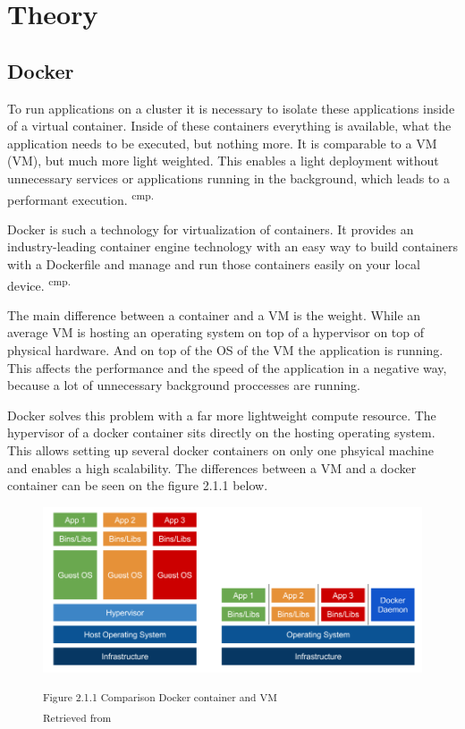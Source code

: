 \chapter{Theory}

\section{Docker} 

To run applications on a cluster it is necessary to isolate these applications inside of a virtual container. Inside of these containers everything is available, what the application needs to be executed, but nothing more. It is comparable to a \acs{VM} (\acl{VM}), but much more light weighted. This enables a light deployment without unnecessary services or applications running in the background, which leads to a performant execution. \textsuperscript{cmp.\cite{11}}


Docker is such a technology for virtualization of containers. It provides an industry-leading container engine technology with an easy way to build containers with a Dockerfile and manage and run those containers easily on your local device. \textsuperscript{cmp.\cite{12}}


The main difference between a container and a VM is the weight. While an average VM is hosting an operating system on top of a hypervisor on top of physical hardware. And on top of the OS of the VM the application is running. This affects the performance and the speed of the application in a negative way, because a lot of unnecessary background proccesses are running. 

Docker solves this problem with a far more lightweight compute resource. The hypervisor of a docker container sits directly on the hosting operating system. This allows setting up several docker containers on only one phsyical machine and enables a high scalability. The differences between a VM and a docker container can be seen on the figure 2.1.1 below.

\begin{figure}[h]
\centering
\includegraphics[width=\textwidth/5*4]{images/docker_vm_differences.png}

\textsuperscript{Figure 2.1.1 Comparison Docker container and VM}\\
\textsuperscript{Retrieved from \cite{13}}
\end{figure}

